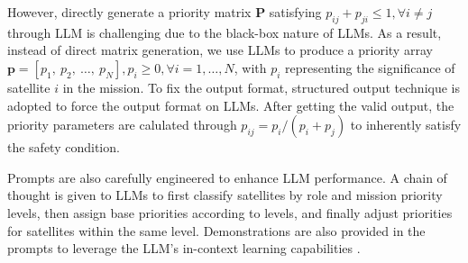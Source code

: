 \documentclass{ifacconf}
\begin{document}
\par However, directly generate a priority matrix $\boldsymbol{P}$ satisfying $p_{ij} + p_{ji} \le 1, \forall i \neq j$ through LLM is challenging due to the black-box nature of LLMs.
As a result, instead of direct matrix generation, we use LLMs to produce a priority array $\mathbf{p} = [p_1,~p_2,~\dots,~p_N], p_i \ge 0, \forall i = 1, \dots, N$, with $p_i$ representing the significance of satellite $i$ in the mission.
To fix the output format, structured output technique is adopted to force the output format on LLMs.
After getting the valid output, the priority parameters are calulated through $p_{ij} = p_i/(p_i + p_j)$ to inherently satisfy the safety condition.

\par Prompts are also carefully engineered to enhance LLM performance. 
A chain of thought is given to LLMs to first classify satellites by role and mission priority levels, then assign base priorities according to levels, and finally adjust priorities for satellites within the same level.
Demonstrations are also provided in the prompts to leverage the LLM's in-context learning capabilities \cite[]{Min2022fewshot}.
\end{document}
